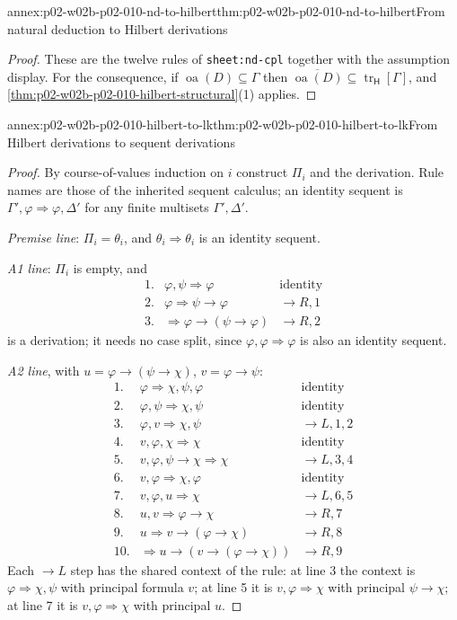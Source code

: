 \begin{annexitem}{annex:p02-w02b-p02-010-nd-to-hilbert}{thm:p02-w02b-p02-010-nd-to-hilbert}{From natural deduction to Hilbert derivations}
\begin{proof}
These are the twelve rules of \texttt{sheet:\allowbreak nd-cpl}
together with the assumption display.  For the consequence, if
\(\operatorname{oa}(D)\subseteq\Gamma\) then
\(\overline{\operatorname{oa}(D)}\subseteq\operatorname{tr}_{\mathsf H}[\Gamma]\),
and \cref{thm:p02-w02b-p02-010-hilbert-structural}(1) applies.
\end{proof}
\end{annexitem}

\begin{annexitem}{annex:p02-w02b-p02-010-hilbert-to-lk}{thm:p02-w02b-p02-010-hilbert-to-lk}{From Hilbert derivations to sequent derivations}
\begin{proof}
By course-of-values induction on \(i\) construct \(\Pi_i\) and the
derivation.  Rule names are those of the inherited sequent calculus; an
identity sequent is \(\Gamma',\varphi\Rightarrow\varphi,\Delta'\) for any
finite multisets \(\Gamma',\Delta'\).

\emph{Premise line}: \(\Pi_i=\theta_i\), and \(\theta_i\Rightarrow\theta_i\) is
an identity sequent.

\emph{A1 line}: \(\Pi_i\) is empty, and
\[
\begin{array}{rll}
1.&\varphi,\psi\Rightarrow\varphi&\text{identity}\\
2.&\varphi\Rightarrow\psi\to\varphi&\to R,1\\
3.&\Rightarrow\varphi\to(\psi\to\varphi)&\to R,2
\end{array}
\]
is a derivation; it needs no case split, since \(\varphi,\varphi\Rightarrow\varphi\)
is also an identity sequent.

\emph{A2 line}, with \(u=\varphi\to(\psi\to\chi)\), \(v=\varphi\to\psi\):
\[
\begin{array}{rll}
1.&\varphi\Rightarrow\chi,\psi,\varphi&\text{identity}\\
2.&\varphi,\psi\Rightarrow\chi,\psi&\text{identity}\\
3.&\varphi,v\Rightarrow\chi,\psi&\to L,1,2\\
4.&v,\varphi,\chi\Rightarrow\chi&\text{identity}\\
5.&v,\varphi,\psi\to\chi\Rightarrow\chi&\to L,3,4\\
6.&v,\varphi\Rightarrow\chi,\varphi&\text{identity}\\
7.&v,\varphi,u\Rightarrow\chi&\to L,6,5\\
8.&u,v\Rightarrow\varphi\to\chi&\to R,7\\
9.&u\Rightarrow v\to(\varphi\to\chi)&\to R,8\\
10.&\Rightarrow u\to(v\to(\varphi\to\chi))&\to R,9
\end{array}
\]
Each \(\to L\) step has the shared context of the rule: at line 3 the
context is \(\varphi\Rightarrow\chi,\psi\) with principal formula \(v\); at
line 5 it is \(v,\varphi\Rightarrow\chi\) with principal \(\psi\to\chi\); at
line 7 it is \(v,\varphi\Rightarrow\chi\) with principal \(u\).


\end{proof}
\end{annexitem}

